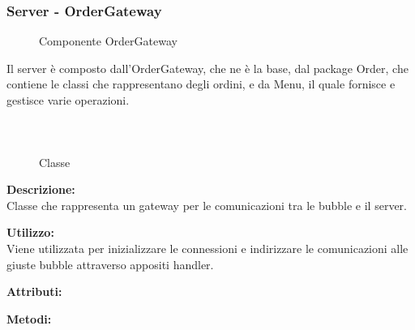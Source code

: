 \subsubsection{Server - OrderGateway}
\begin{figure}[H]
	\centering
	\caption{Componente OrderGateway}
\end{figure}
Il server è composto dall'OrderGateway, che ne è la base, dal package Order, che contiene le classi che rappresentano degli ordini, e da Menu, il quale fornisce e gestisce varie operazioni.

\subparagraph[::OrderContainer]{\class}\mbox{}\\ \label{\class}
\begin{figure}[H]
	\centering
	\caption{Classe \class}
\end{figure}
\textbf{Descrizione:}\\
Classe che rappresenta un gateway per le comunicazioni tra le bubble e il server.

\textbf{Utilizzo:}\\
Viene utilizzata per inizializzare le connessioni e indirizzare le comunicazioni alle giuste bubble attraverso appositi handler.

%

\textbf{Attributi:}

\textbf{Metodi:}

